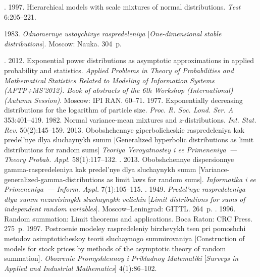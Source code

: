 \begin{multicols}{2}
{{\begin{thebibliography}{99}
\vspace*{1pt}

. 1997. 
Hierarchical models with scale mixtures of normal distributions.
\textit{Test} 6:205--221.

\vspace*{1pt}

 1983.
\textit{Odnomernye ustoychivye raspredeleniya} 
[\textit{One-dimensional stable distributions}].  Moscow: Nauka. 304~p.

. 2012.
Exponential power distributions as asymptotic approximations in applied probability 
and statistics. \textit{Applied Problems in Theory of Probabilities and Mathematical 
Statistics Related to Modeling of Information Systems (APTP\;+\;MS'2012). 
Book of abstracts of the 
6th  Workshop (International) (Autumn Session)}. 
Moscow: IPI RAN. 60--71.
  1977.
Exponentially decreasing distributions for the logarithm of particle size.
\textit{Proc. R. Soc. Lond. Ser. A} 353:401--419.
  1982.
Normal variance-mean mixtures and $z$-distributions. 
\textit{Int. Stat. Rev.}  50(2):145--159.
 2013. 
Obobshchennye giperbolicheskie raspredeleniya kak predel'nye dlya sluchaynykh summ 
[Generalized hyperbolic distributions as limit distributions for random sums] 
\textit{Teoriya Veroyatnostey i ee Primeneniya~---
Theory Probab. Appl.} 58(1):117--132.
. 2013. 
Obobshchennye dispersionnye gamma-raspredeleniya kak predel'nye dlya sluchaynykh summ 
[Variance-generalized-gamma-distributions as limit laws for random sums]. 
\textit{Informatika i ee Primeneniya~--- Inform. Appl.} 7(1):105--115.
. 1949. 
\textit{Predel'nye raspredeleniya dlya summ nezavisimykh sluchaynykh velichin} 
[\textit{Limit distributions for sums of independent random variables}]. Moscow--Leningrad: GITTL.
264~p.
.  1996.
Random summation: Limit theorems and applications. Boca Raton: CRC Press. 275~p.
 1997. 
Postroenie modeley raspredeleniy birzhevykh tsen pri pomoshchi metodov 
asimptoti\-che\-skoy teorii sluchaynogo summirovaniya [Construction of models 
for stock prices by methods of the asymptotic theory of random summation]. 
\textit{Obozrenie Promyshlennoy i Prikladnoy Matematiki} 
[\textit{Surveys in Applied and Industrial Mathematics}] 4(1):86--102.
\columnbreak


\end{thebibliography}}}
\end{multicols}
